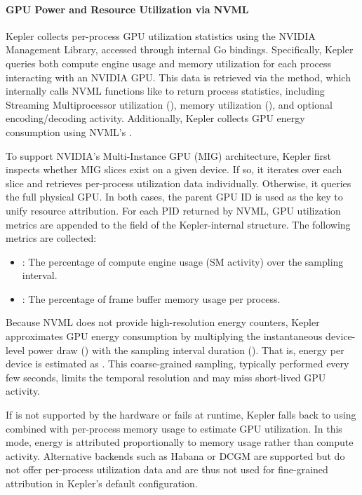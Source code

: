 \paragraph{GPU Power and Resource Utilization via NVML}

Kepler collects per-process GPU utilization statistics using the NVIDIA Management Library, accessed through internal Go bindings. Specifically, Kepler queries both compute engine usage and memory utilization for each process interacting with an NVIDIA GPU. This data is retrieved via the  method, which internally calls NVML functions like  to return process statistics, including Streaming Multiprocessor utilization (), memory utilization (), and optional encoding/decoding activity. Additionally, Kepler collects GPU energy consumption using NVML's .

To support NVIDIA's Multi-Instance GPU (MIG) architecture, Kepler first inspects whether MIG slices exist on a given device. If so, it iterates over each slice and retrieves per-process utilization data individually. Otherwise, it queries the full physical GPU. In both cases, the parent GPU ID is used as the key to unify resource attribution. For each PID returned by NVML, GPU utilization metrics are appended to the  field of the Kepler-internal  structure. The following metrics are collected:
\begin{itemize}
  \item {}: The percentage of compute engine usage (SM activity) over the sampling interval.
  \item {}: The percentage of frame buffer memory usage per process.
\end{itemize}

Because NVML does not provide high-resolution energy counters, Kepler approximates GPU energy consumption by multiplying the instantaneous device-level power draw () with the sampling interval duration (). That is, energy per device is estimated as . This coarse-grained sampling, typically performed every few seconds, limits the temporal resolution and may miss short-lived GPU activity.

If  is not supported by the hardware or fails at runtime, Kepler falls back to using  combined with per-process memory usage to estimate GPU utilization. In this mode, energy is attributed proportionally to memory usage rather than compute activity. Alternative backends such as Habana or DCGM are supported but do not offer per-process utilization data and are thus not used for fine-grained attribution in Kepler’s default configuration.

